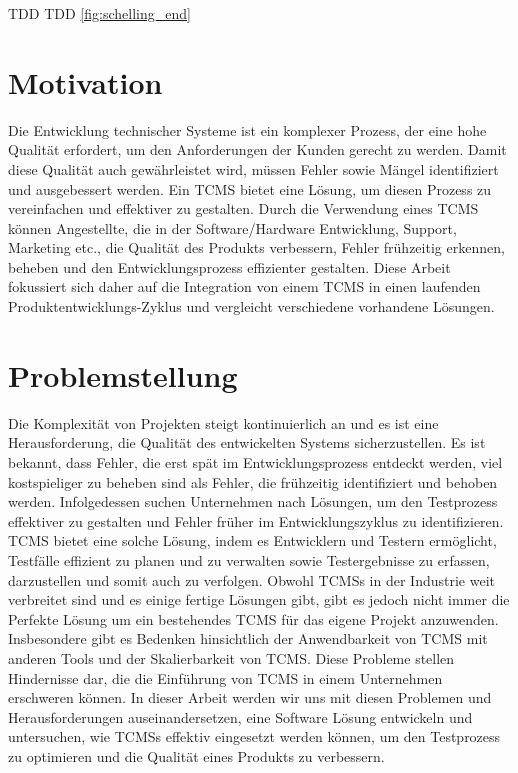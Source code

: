 \documentclass[a4paper, fontsize=11pt, parskip=half, twoside]{scrreprt}
\begin{document}
	\ac{TDD}
	\ac{TDD}
	\textcite{harman_well-wrought_2012}
	\cref{fig:schelling_end}
	
	\cite{harman_well-wrought_2012}
	
	\section{Motivation}
	Die Entwicklung technischer Systeme ist ein komplexer Prozess, der eine hohe Qualität erfordert, um den Anforderungen der Kunden gerecht zu werden. 
	Damit diese Qualität auch gewährleistet wird, müssen Fehler sowie Mängel identifiziert und ausgebessert werden. 
	Ein \ac{TCMS} bietet eine Lösung, um diesen Prozess zu vereinfachen und effektiver zu gestalten. 
	Durch die Verwendung eines \ac{TCMS} können Angestellte, die in der Software/Hardware Entwicklung, Support, Marketing etc., die Qualität des Produkts verbessern, Fehler frühzeitig erkennen, beheben und den Entwicklungsprozess effizienter gestalten. 
	Diese Arbeit fokussiert sich daher auf die Integration von einem \ac{TCMS} in einen laufenden Produktentwicklungs-Zyklus und vergleicht verschiedene vorhandene Lösungen.
	
	\section{Problemstellung}
	Die Komplexität von Projekten steigt kontinuierlich an und es ist eine Herausforderung, die Qualität des entwickelten Systems sicherzustellen. 
	Es ist bekannt, dass Fehler, die erst spät im Entwicklungsprozess entdeckt werden, viel kostspieliger zu beheben sind als Fehler, die frühzeitig identifiziert und behoben werden. 
	Infolgedessen suchen Unternehmen nach Lösungen, um den Testprozess effektiver zu gestalten und Fehler früher im Entwicklungszyklus zu identifizieren. 
	\ac{TCMS} bietet eine solche Lösung, indem es Entwicklern und Testern ermöglicht, Testfälle effizient zu planen und zu verwalten sowie Testergebnisse zu erfassen, darzustellen und somit auch zu verfolgen. 
	Obwohl \aclp{TCMS} in der Industrie weit verbreitet sind und es einige fertige Lösungen gibt, gibt es jedoch nicht immer die Perfekte Lösung um ein bestehendes \ac{TCMS} für das eigene Projekt anzuwenden. 
	Insbesondere gibt es Bedenken hinsichtlich der Anwendbarkeit von \ac{TCMS} mit anderen Tools und der Skalierbarkeit von \ac{TCMS}. 
	Diese Probleme stellen Hindernisse dar, die die Einführung von \ac{TCMS} in einem Unternehmen erschweren können. 
	In dieser Arbeit werden wir uns mit diesen Problemen und Herausforderungen auseinandersetzen, eine Software Lösung entwickeln und untersuchen, wie \aclp{TCMS} effektiv eingesetzt werden können, um den Testprozess zu optimieren und die Qualität eines Produkts zu verbessern.
	
\end{document}
